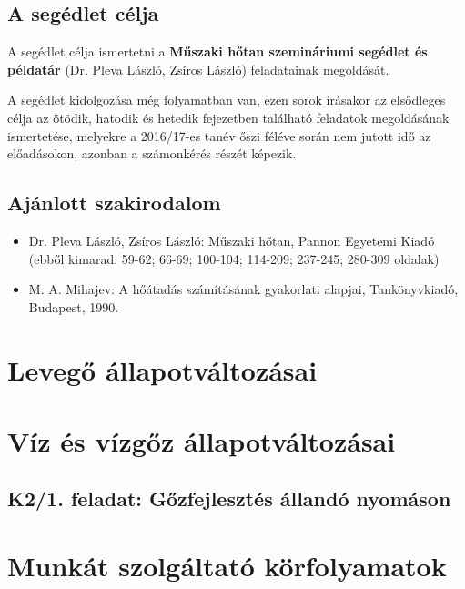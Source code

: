 \documentclass[11pt, a4paper]{report}
\begin{document}
\section*{A segédlet célja}

A segédlet célja ismertetni a \textbf{Műszaki hőtan szemináriumi segédlet és példatár} (Dr. Pleva László, Zsíros László) feladatainak megoldását.

A segédlet kidolgozása még folyamatban van, ezen sorok írásakor az elsődleges célja az ötödik, hatodik és hetedik fejezetben található feladatok megoldásának ismertetése, melyekre a 2016/17-es tanév őszi féléve során nem jutott idő az előadásokon, azonban a számonkérés részét képezik.


\section*{Ajánlott szakirodalom}

\begin{itemize}
	\item Dr. Pleva László, Zsíros László: Műszaki hőtan, Pannon Egyetemi Kiadó (ebből kimarad: 59-62; 66-69; 100-104; 114-209; 237-245; 280-309 oldalak)
	\item M. A. Mihajev: A hőátadás számításának gyakorlati alapjai, Tankönyvkiadó, Budapest, 1990.
\end{itemize}


\chapter{Levegő állapotváltozásai}




\chapter{Víz és vízgőz állapotváltozásai}

\section*{K2/1. feladat: Gőzfejlesztés állandó nyomáson}


\chapter{Munkát szolgáltató körfolyamatok}
\end{document}

